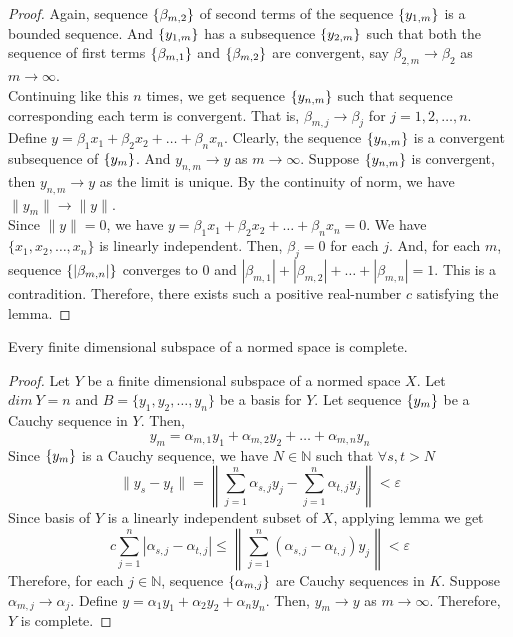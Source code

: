\begin{proof}
	Again, sequence $\{\beta_{m,2}\}$ of second terms of the sequence $\{y_{1,m}\}$ is a bounded sequence.
	And $\{y_{1,m}\}$ has a subsequence $\{y_{2,m}\}$ such that both the sequence of first terms $\{\beta_{m,1}\}$ and $\{\beta_{m,2}\}$ are convergent, say $\beta_{2,m} \to \beta_2$ as $m \to \infty$.\\

	Continuing like this $n$ times, we get sequence $\{y_{n,m}\}$ such that sequence corresponding each term is convergent.
	That is, $\beta_{m,j} \to \beta_j$ for $j=1,2,\dots,n$.\\

	Define $y = \beta_1 x_1 + \beta_2 x_2 + \dots + \beta_n x_n$.
	Clearly, the sequence $\{y_{n,m}\}$ is a convergent subsequence of $\{y_m\}$.
	And $y_{n,m} \to y$ as $m \to \infty$.
	Suppose $\{y_{n,m}\}$ is convergent, then $y_{n,m} \to y$ as the limit is unique.
	By the continuity of norm, we have $\| y_m \| \to \| y \|$.\\

	Since $\| y \| = 0$, we have $y = \beta_1 x_1 + \beta_2 x_2 + \dots + \beta_n x_n = 0$.
	We have $\{ x_1, x_2, \dots, x_n \}$ is linearly independent.
	Then, $\beta_j = 0$ for each $j$.
	And, for each $m$, sequence $\{|\beta_{m,n} |\}$ converges to $0$ and $|\beta_{m,1}|+|\beta_{m,2}|+\dots+|\beta_{m,n}| = 1$.
	This is a contradition.
	Therefore, there exists such a positive real-number $c$ satisfying the lemma.
\end{proof}
\begin{theorem}
	Every finite dimensional subspace of a normed space is complete.
\end{theorem}
\begin{proof}
	Let $Y$ be a finite dimensional subspace of a normed space $X$.
	Let $dim\ Y = n$ and $B = \{ y_1, y_2, \dots, y_n \}$ be a basis for $Y$.
	Let sequence $\{y_m\}$ be a Cauchy sequence in $Y$.
	Then,
	$$ y_m = \alpha_{m,1} y_1 + \alpha_{m,2} y_2 + \dots + \alpha_{m,n} y_n $$
	Since $\{y_m\}$ is a Cauchy sequence, we have $N \in \mathbb{N}$ such that $\forall s,t > N$
	$$ \| y_s - y_t \| = \left\| \sum_{j=1}^n \alpha_{s,j} y_j - \sum_{j=1}^n \alpha_{t,j} y_j \right\| < \varepsilon $$
	Since basis of $Y$ is a linearly independent subset of $X$, applying lemma we get
	$$ c \sum_{j=1}^n \left|\alpha_{s,j} - \alpha_{t,j} \right| \le \left \| \sum_{j=1}^n (\alpha_{s,j}-\alpha_{t,j}) y_j \right\| < \varepsilon $$
	Therefore, for each $j \in \mathbb{N}$, sequence $\{\alpha_{m,j}\}$ are Cauchy sequences in $K$.
	Suppose $\alpha_{m,j} \to \alpha_j$.
	Define $y = \alpha_1 y_1 + \alpha_2 y_2 + \alpha_n y_n$.
	Then, $y_m \to y$ as $m \to \infty$.
	Therefore, $Y$ is complete.
\end{proof}

